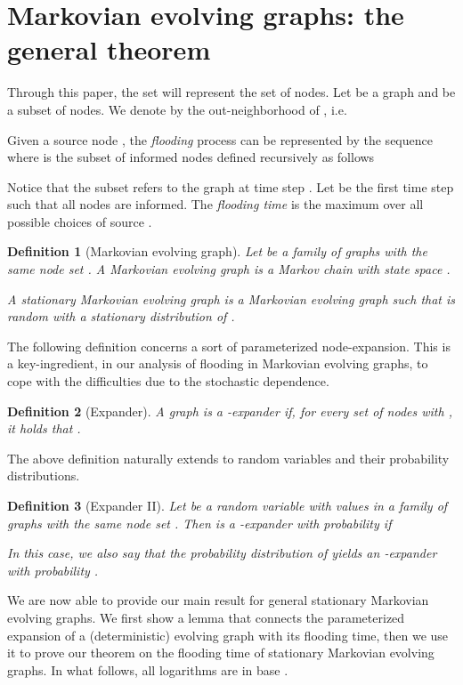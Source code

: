 \documentclass[10pt,a4paper]{article}
\newtheorem{definition}{Definition}[section]
\begin{document}
\section{Markovian evolving graphs: the general theorem}\label{sec::gen}
Through this paper, the set   will represent the set of  nodes. Let  be a graph and  be a subset of nodes. We denote by  the out-neighborhood of , i.e.

Given a source node , the \emph{flooding} process can be represented by the sequence  where   is the subset of informed nodes defined recursively as follows

Notice that the subset  refers to the graph at time step . Let  be the first time step such that all nodes are informed. The \emph{flooding time} is the maximum  over all possible choices of source .


\begin{definition}[Markovian evolving  graph]\label{def::Markovevolv}
Let  be a family of graphs with the same node set . A \emph{Markovian evolving graph}  is a Markov chain with state space .

\noindent A \emph{stationary} Markovian evolving  graph is a Markovian evolving graph  such that  is random with a stationary distribution of .
\end{definition}


\noindent The following definition concerns a sort of parameterized node-expansion. This is a key-ingredient, in our analysis of flooding in Markovian evolving  graphs, to cope with the difficulties due to the stochastic dependence.

\begin{definition}[Expander]
A graph  is a \emph{-expander} if, for every set of nodes  with , it holds that .
\end{definition}

\noindent The above definition naturally extends to random variables and their probability distributions.

\begin{definition}[Expander II]
Let  be a random variable with values in a family of graphs with the same node set . Then  is a \emph{-expander} with probability  if

In this case, we also say that the probability distribution of  \emph{yields} an -expander with probability .
\end{definition}

\noindent We are now able to provide our main result for general stationary Markovian evolving graphs. We first show a lemma that connects the parameterized expansion of a (deterministic) evolving graph with its flooding time, then we use it to prove our theorem on the flooding time of stationary Markovian evolving graphs. In what follows, all    logarithms are in  base .
\end{document}
